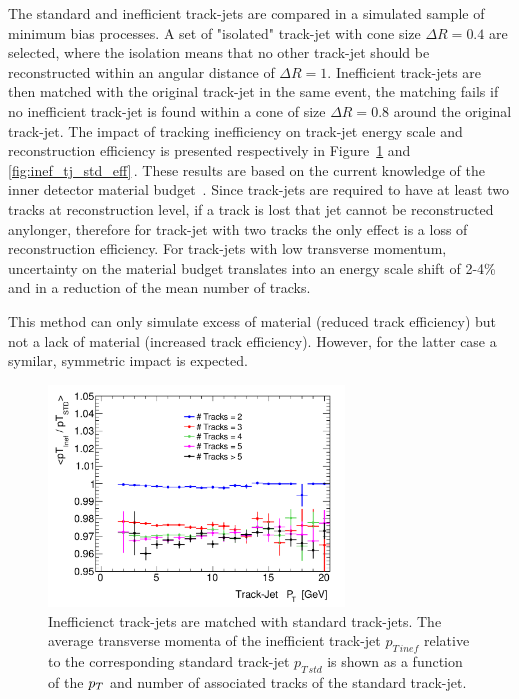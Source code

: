 The standard and inefficient track-jets are compared in a simulated sample of minimum bias processes. 
A set of "isolated" track-jet with cone size $\Delta R = 0.4$ are selected, where the isolation 
means that no other track-jet should be reconstructed within an angular distance of $\Delta R = 1$. 
Inefficient track-jets are then matched with the original track-jet in the same event,
the matching fails if no inefficient track-jet is found within a cone of size $\Delta R = 0.8$ around
the original track-jet. The impact of tracking inefficiency on track-jet energy scale and reconstruction
efficiency is presented respectively in Figure~\ref{fig:inef_tj_std_scale} and \ref{fig:inef_tj_std_eff}$\,$. These 
results are based on the current knowledge of the inner detector material budget~\cite{IDMaterial}. 
Since track-jets are required to have at least two tracks at reconstruction level, if a track 
is lost that jet  cannot be reconstructed anylonger, therefore for track-jet with two tracks 
the only effect is a loss of reconstruction efficiency. For track-jets with low transverse momentum, uncertainty on the material budget 
translates into an energy scale shift of 2-4\% and in a reduction of the mean number of tracks.

This method can only simulate excess of material (reduced track efficiency) but not a lack of material
(increased track efficiency). However, for the latter case a symilar, symmetric impact is expected.

\begin{figure}[tp]
\centering
\includegraphics[width=0.7\textwidth]{figure/trackjet/T7/Sys_pt_nTrack2.pdf} 
\caption{Inefficienct track-jets are matched with standard track-jets. The average transverse momenta of the inefficient track-jet $p_{T \, inef}$
	relative to the corresponding standard track-jet $p_{T \, std}$ is shown as a function of the 
	$p_{T}$ and number of associated tracks of the standard track-jet.}

\label{fig:inef_tj_std_scale}
\end{figure}    


